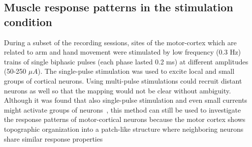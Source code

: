 

% 
\subsection{Muscle response patterns in the stimulation condition} %
\label{sg:sub:evoked_responses}

During a subset of the recording sessions, sites of the motor-cortex which are related to arm and hand movement were stimulated by low frequency (0.3 Hz) trains of single biphasic pulses (each phase lasted 0.2 ms) at different amplitudes (50-250 $\mu A$). The single-pulse stimulation was used to excite local and small groups of cortical neurons. Using multi-pulse stimulations could recruit distant neurons as well so that the mapping would not be clear without ambiguity. Although it was found that also single-pulse stimulation and even small currents might activate groups of neurons~\citet{Tehovnik:1996p3982}, this method can still be used to investigate the response patterns of motor-cortical neurons because the motor cortex shows topographic organization into a patch-like structure where neighboring neurons share similar response properties~\citet{Lee:1998p4164}

